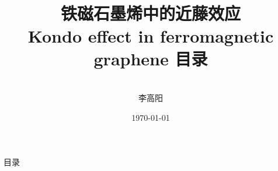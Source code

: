 \documentclass[9pt,t]{beamer} %
\title[交叉学科中心]{\ \\ \ \\ 
铁磁石墨烯中的近藤效应\\ 
\Large{Kondo effect in ferromagnetic graphene}
}
\author[李高阳]{
\ \\ 
李高阳}
\date{\today}
\begin{document}
\begin{frame}[plain,t]
\normalsize
\titlepage
\end{frame}
\addtocounter{framenumber}{-1}  %
\title{目录}
\begin{frame}{目录}
\tableofcontents
\end{frame}
\end{document}

